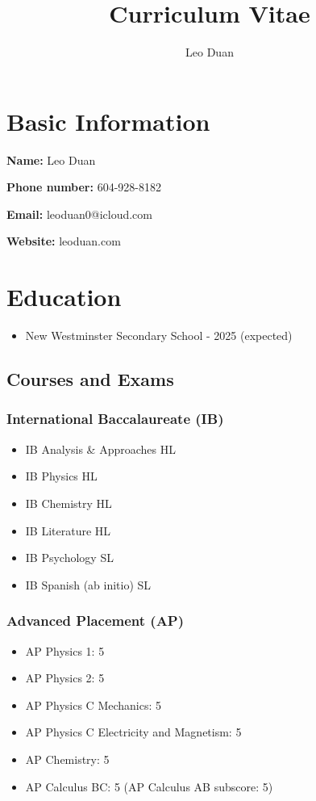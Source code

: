 \documentclass{article}
\title{\textbf{Curriculum Vitae}}
\author{Leo Duan}
\date{}
\begin{document}
\maketitle

\section*{Basic Information}

\textbf{Name:} Leo Duan

\textbf{Phone number:} 604-928-8182

\textbf{Email:} leoduan0@icloud.com

\textbf{Website:} leoduan.com

\section*{Education}

\begin{itemize}
	\item New Westminster Secondary School - 2025 (expected)
\end{itemize}

\subsection*{Courses and Exams}

\subsubsection*{International Baccalaureate (IB)}

\begin{itemize}
	\item IB Analysis \& Approaches HL
	\item IB Physics HL
	\item IB Chemistry HL
	\item IB Literature HL
	\item IB Psychology SL
	\item IB Spanish (ab initio) SL
\end{itemize}

\subsubsection*{Advanced Placement (AP)}

\begin{itemize}
	\item AP Physics 1: 5
	\item AP Physics 2: 5
	\item AP Physics C Mechanics: 5
	\item AP Physics C Electricity and Magnetism: 5
	\item AP Chemistry: 5
	\item AP Calculus BC: 5 (AP Calculus AB subscore: 5)
\end{itemize}
\end{document}
